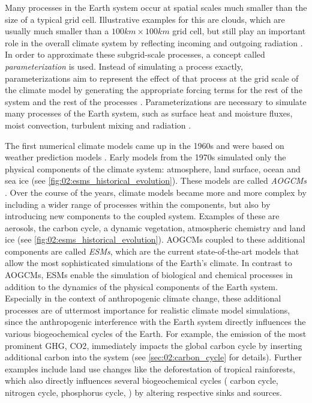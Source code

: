 Many processes in the Earth system occur at spatial scales much smaller than
the size of a typical grid cell. Illustrative examples for this are clouds,
which are usually much smaller than a $100 \unit{km} \times 100 \unit{km}$ grid
cell, but still play an important role in the overall climate system by
reflecting incoming and outgoing radiation \autocite{Boucher2013}. In order to
approximate these subgrid-scale processes, a concept called
\emph{parameterization} is used. Instead of simulating a process exactly,
parameterizations aim to represent the effect of that process at the grid scale
of the climate model by generating the appropriate forcing terms for the rest
of the system and the rest of the processes \autocite{Gettelman2016}.
Parameterizations are necessary to simulate many processes of the Earth system,
such as surface heat and moisture fluxes, moist convection, turbulent mixing
and radiation \autocite{Holton2004}.

The first numerical climate models came up in the 1960s and were based on
weather prediction models \autocite{Flato2011}. Early models from the 1970s
simulated only the physical components of the climate system: atmosphere, land
surface, ocean and sea ice (see \cref{fig:02:esms_historical_evolution}). These
models are called \emph{\acp{AOGCM}} \autocite{Flato2013}. Over the course of
the years, climate models became more and more complex by including a wider
range of processes within the components, but also by introducing new
components to the coupled system. Examples of these are aerosols, the carbon
cycle, a dynamic vegetation, atmospheric chemistry and land ice (see
\cref{fig:02:esms_historical_evolution}). \acp{AOGCM} coupled to these
additional components are called \emph{\acfp{ESM}}, which are the current
state-of-the-art models that allow the most sophisticated simulations of the
Earth's climate. In contrast to \acp{AOGCM}, \acp{ESM} enable the simulation of
biological and chemical processes in addition to the dynamics of the physical
components of the Earth system. Especially in the context of anthropogenic
climate change, these additional processes are of uttermost importance for
realistic climate model simulations, since the anthropogenic interference with
the Earth system directly influences the various biogeochemical cycles of the
Earth. For example, the emission of the most prominent \ac{GHG}, \ac{CO2},
immediately impacts the global carbon cycle by inserting additional carbon into
the system (see \cref{sec:02:carbon_cycle} for details). Further examples
include land use changes like the deforestation of tropical rainforests, which
also directly influences several biogeochemical cycles (\eg{} carbon cycle,
nitrogen cycle, phosphorus cycle, \etc{}) by altering respective sinks and
sources.


